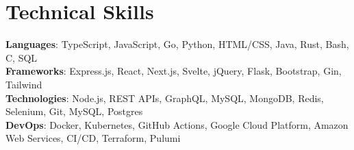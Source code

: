 \section{Technical Skills}
    \begin{itemize}[leftmargin=0.15in, label={}]
	\small{\item{
		\textbf{Languages}{: TypeScript, JavaScript, Go, Python, HTML/CSS, Java, Rust, Bash, C,  SQL} \\
		\textbf{Frameworks}{: Express.js, React, Next.js, Svelte, jQuery, Flask, Bootstrap, Gin, Tailwind} \\
		\textbf{Technologies}{: Node.js, REST APIs, GraphQL, MySQL, MongoDB, Redis, Selenium, Git, MySQL, Postgres} \\
		\textbf{DevOps}{: Docker, Kubernetes, GitHub Actions, Google Cloud Platform, Amazon Web Services, CI/CD, Terraform, Pulumi}
	}}
    \end{itemize}

